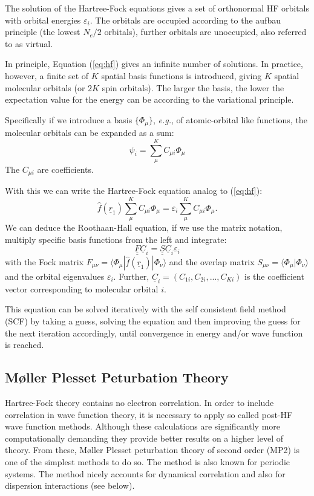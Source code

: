 \documentclass[11pt,DIV=13,BCOR=5mm,a4paper,headinclude]{scrbook}
\renewcommand{\vec}[1]{\underline{#1}}
\def\doubleunderline#1{\underline{\underline{#1}}}
\begin{document}
The solution of the Hartree-Fock equations gives a set of orthonormal HF orbitals with orbital energies $\varepsilon_i$.
The orbitals are occupied according to the aufbau principle (the lowest $N_e/2$ orbitals), further orbitals are unoccupied, also referred to as virtual. 

In principle, Equation (\ref{eq:hf}) gives an infinite number of solutions.
In practice, however, a finite set of $K$ spatial basis functions is introduced, giving $K$ spatial molecular orbitals (or $2K$ spin orbitals).
The larger the basis, the lower the expectation value for the energy can be according to the variational principle.

Specifically if we introduce a basis $\{\Phi_\mu\}$, \textit{e.g.}, of atomic-orbital like functions, the molecular orbitals can be expanded as a sum:
\begin{equation}\label{eq:basis}
\psi_i=\sum_\mu^KC_{\mu i}\Phi_\mu
\end{equation}
The $C_{\mu i}$ are coefficients.

With this we can write the Hartree-Fock equation analog to (\ref{eq:hf}):
\begin{equation}
 \hat{f}(\vec{r}_1) \sum_\mu^KC_{\mu i}\Phi_\mu = \varepsilon_i \sum_\mu^KC_{\mu i}\Phi_\mu.
\end{equation}
We can deduce the Roothaan-Hall equation, if we use the matrix notation, multiply specific basis functions from the left and integrate:
\begin{equation}\label{eq:RH}
 \doubleunderline{F} \vec{C}_i=\doubleunderline{S} \vec{C}_i\varepsilon_i
\end{equation}
with the Fock matrix $F_{\mu\nu}=\langle \Phi_\mu|\hat{f}(\vec{r}_1)|\Phi_\nu\rangle$ and the overlap matrix $S_{\mu\nu}=\langle \Phi_\mu|\Phi_\nu\rangle$ and the orbital eigenvalues $\varepsilon_i$.
Further, $\vec{C}_i=(C_{1i}, C_{2i},...,C_{Ki})$ is the coefficient vector corresponding to molecular orbital $i$.

This equation can be solved iteratively with the self consistent field method (SCF) by taking a guess, solving the equation and then improving the guess for the next iteration accordingly, until convergence in energy and/or wave function is reached.


\subsection{M\o{}ller Plesset Peturbation Theory}
Hartree-Fock theory contains no electron correlation.
In order to include correlation in wave function theory, it is necessary to apply so called post-HF wave function methods.
Although these calculations are significantly more computationally demanding they provide better results on a higher level of theory.
From these, M\o{}ller Plesset peturbation theory of second order (MP2)\cite{mollerplesset} is one of the simplest methods to do so.
The method is also known for periodic systems\cite{Suhai1984}.
The method nicely accounts for dynamical correlation and also for dispersion interactions (see below).
\end{document}
